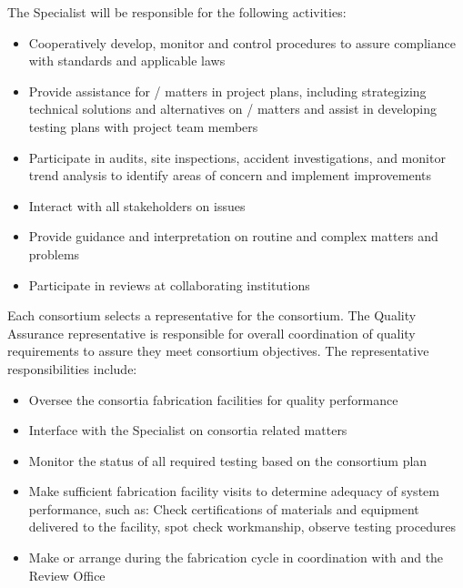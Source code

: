 The   Specialist will be responsible for the
following activities:
\begin{itemize}
	\item Cooperatively develop, monitor and control 
           procedures to assure compliance with 
          standards and applicable laws
     \item Provide assistance for / matters in project
       plans, including strategizing technical solutions and
       alternatives on / matters and assist in developing
       testing plans with project team members
	   \item Participate in audits, site inspections, accident
             investigations, and monitor trend analysis to identify
             areas of concern and implement improvements
	\item Interact with all stakeholders on  issues
      \item Provide guidance and interpretation on routine and complex
         matters and problems
	\item Participate in reviews at collaborating institutions
\end{itemize}

Each consortium selects a  representative for the
consortium.  The Quality Assurance representative is responsible for
overall coordination of quality requirements to assure they meet
consortium objectives.  The  representative responsibilities
include:
\begin{itemize}
  \item Oversee the consortia fabrication facilities for quality
    performance
  \item Interface with the   Specialist on
    consortia  related matters
  \item Monitor the status of all required testing based on the
    consortium  plan
  \item Make sufficient fabrication facility visits to determine
    adequacy of  system performance, such as: Check certifications
    of materials and equipment delivered to the facility, spot check
    workmanship, observe testing procedures
  \item Make or arrange  during the fabrication cycle in
    coordination with  and the  Review Office
\end{itemize}

